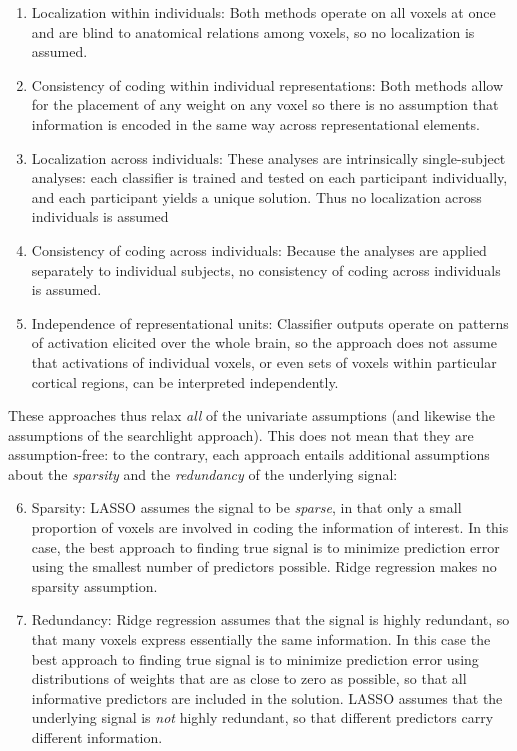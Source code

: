 \begin{enumerate}
\item Localization within individuals: Both methods operate on all voxels at once and are blind to anatomical relations among voxels, so no localization is assumed.

\item Consistency of coding within individual representations: Both methods allow for the placement of any weight on any voxel so there is no assumption that information is encoded in the same way across representational elements.

\item Localization across individuals: These analyses are intrinsically single-subject analyses: each classifier is trained and tested on each participant individually, and each participant yields a unique solution. Thus no localization across individuals is assumed

\item Consistency of coding across individuals: Because the analyses are applied separately to individual subjects, no consistency of coding across individuals is assumed.

\item Independence of representational units: Classifier outputs operate on patterns of activation elicited over the whole brain, so the approach does not assume that activations of individual voxels, or even sets of voxels within particular cortical regions, can be interpreted independently.
\end{enumerate}

These approaches thus relax {\em all} of the univariate assumptions (and likewise the assumptions of the searchlight approach). This does not mean that they are assumption-free: to the contrary, each approach entails additional assumptions about the {\em sparsity} and the {\em redundancy} of the underlying signal:

\begin{enumerate}
\setcounter{enumi}{5}
\item Sparsity: LASSO assumes the signal to be {\em sparse}, in that only a small proportion of voxels are involved in coding the information of interest. In this case, the best approach to finding true signal is to minimize prediction error using the smallest number of predictors possible. Ridge regression makes no sparsity assumption.

\item Redundancy: Ridge regression assumes that the signal is highly redundant, so that many voxels express essentially the same information. In this case the best approach to finding true signal is to minimize prediction error using distributions of weights that are as close to zero as possible, so that all informative predictors are included in the solution. LASSO assumes that the underlying signal is {\em not} highly redundant, so that different predictors carry different information.
\end{enumerate}

